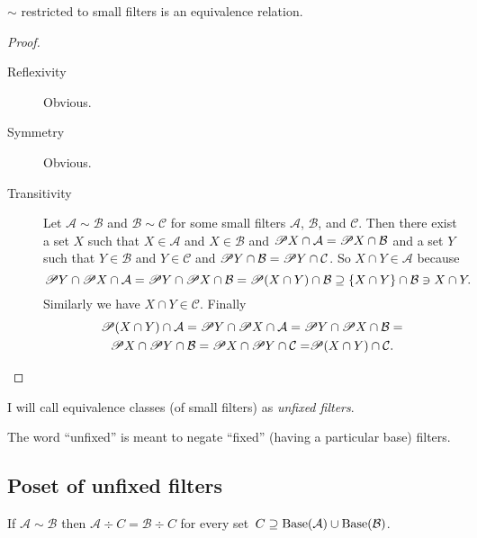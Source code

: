 \begin{prop}
$\sim$ restricted to small filters is an equivalence relation.\end{prop}
\begin{proof}
~
\begin{description}
\item [{Reflexivity}] Obvious.
\item [{Symmetry}] Obvious.
\item [{Transitivity}] Let $\mathcal{A}\sim\mathcal{B}$ and $\mathcal{B}\sim\mathcal{C}$
for some small filters $\mathcal{A}$, $\mathcal{B}$, and $\mathcal{C}$.
Then there exist a set $X$ such that $X\in\mathcal{A}$ and $X\in\mathcal{B}$
and $\mathscr{P} X\cap\mathcal{A}=\mathscr{P} X\cap\mathcal{B}$ and a set
$Y$ such that $Y\in\mathcal{B}$ and $Y\in\mathcal{C}$ and $\mathscr{P} Y\cap\mathcal{B}=\mathscr{P} Y\cap\mathcal{C}$.
So $X\cap Y\in\mathcal{A}$ because
\[
\mathscr{P} Y\cap\mathscr{P} X\cap\mathcal{A}=\mathscr{P} Y\cap\mathscr{P} X\cap\mathcal{B}=\mathscr{P}(X\cap Y)\cap\mathcal{B}\supseteq\{X\cap Y\}\cap\mathcal{B}\ni X\cap Y.
\]
Similarly we have $X\cap Y\in\mathcal{C}$. Finally
\begin{multline*}
\mathscr{P}(X\cap Y)\cap\mathcal{A}=\mathscr{P} Y\cap\mathscr{P} X\cap\mathcal{A}=\mathscr{P} Y\cap\mathscr{P} X\cap\mathcal{B}=\\
\mathscr{P} X\cap\mathscr{P} Y\cap\mathcal{B}=\mathscr{P} X\cap\mathscr{P} Y\cap\mathcal{C=}\mathscr{P}(X\cap Y)\cap\mathcal{C}.
\end{multline*}

\end{description}
\end{proof}

\begin{defn}
I will call equivalence classes (of small filters) as
\emph{unfixed filters}.
\end{defn}

\begin{rem}
The word ``unfixed'' is meant to negate ``fixed'' (having
a particular base) filters.
\end{rem}

\subsection{Poset of unfixed filters}

\begin{lem}\label{filteq-big}
If $\mathcal{A}\sim\mathcal{B}$ then
$\mathcal{A}\div C=\mathcal{B}\div C$
for every
set~$C\supseteq\operatorname{Base}(\mathcal{A})\cup\operatorname{Base}(\mathcal{B})$.
\end{lem}

